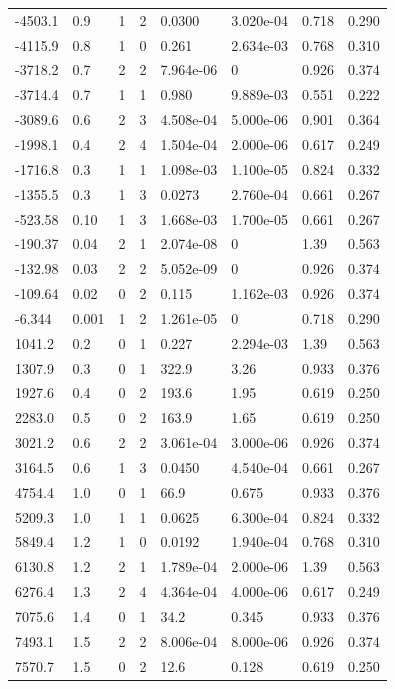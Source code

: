 \documentclass[preview]{standalone}
\begin{document}
{{\begin{tabular}{L{1.2cm}C{1.2cm} C{0.3cm}C{0.5cm} C{1.4cm}C{1.4cm} C{1.4cm}C{1.4cm}}
  -4503.1  &   0.9  & 1     &  2 &  0.0300  & 3.020e-04  & 0.718 &  0.290   \\ 
  -4115.9  &   0.8  & 1     &  0 &  0.261  & 2.634e-03  & 0.768 &  0.310   \\ 
  -3718.2  &   0.7  & 2     &  2 &  7.964e-06  & 0  & 0.926 &  0.374   \\ 
  -3714.4  &   0.7  & 1     &  1 &  0.980  & 9.889e-03  & 0.551 &  0.222   \\ 
  -3089.6  &   0.6  & 2     &  3 &  4.508e-04  & 5.000e-06  & 0.901 &  0.364   \\ 
  -1998.1  &   0.4  & 2     &  4 &  1.504e-04  & 2.000e-06  & 0.617 &  0.249   \\ 
  -1716.8  &   0.3  & 1     &  1 &  1.098e-03  & 1.100e-05  & 0.824 &  0.332   \\ 
  -1355.5  &   0.3  & 1     &  3 &  0.0273  & 2.760e-04  & 0.661 &  0.267   \\ 
  -523.58  &  0.10  & 1     &  3 &  1.668e-03  & 1.700e-05  & 0.661 &  0.267   \\ 
  -190.37  &  0.04  & 2     &  1 &  2.074e-08  & 0  & 1.39 &  0.563   \\ 
  -132.98  &  0.03  & 2     &  2 &  5.052e-09  & 0  & 0.926 &  0.374   \\ 
  -109.64  &  0.02  & 0     &  2 &  0.115  & 1.162e-03  & 0.926 &  0.374   \\ 
  -6.344  &  0.001  & 1     &  2 &  1.261e-05  & 0  & 0.718 &  0.290   \\ 
  1041.2  &   0.2  & 0     &  1 &  0.227  & 2.294e-03  & 1.39 &  0.563   \\ 
  1307.9  &   0.3  & 0     &  1 &  322.9  & 3.26  & 0.933 &  0.376   \\ 
  1927.6  &   0.4  & 0     &  2 &  193.6  & 1.95  & 0.619 &  0.250   \\ 
  2283.0  &   0.5  & 0     &  2 &  163.9  & 1.65  & 0.619 &  0.250   \\ 
  3021.2  &   0.6  & 2     &  2 &  3.061e-04  & 3.000e-06  & 0.926 &  0.374   \\ 
  3164.5  &   0.6  & 1     &  3 &  0.0450  & 4.540e-04  & 0.661 &  0.267   \\ 
  4754.4  &   1.0  & 0     &  1 &  66.9  & 0.675  & 0.933 &  0.376   \\ 
  5209.3  &   1.0  & 1     &  1 &  0.0625  & 6.300e-04  & 0.824 &  0.332   \\ 
  5849.4  &   1.2  & 1     &  0 &  0.0192  & 1.940e-04  & 0.768 &  0.310   \\ 
  6130.8  &   1.2  & 2     &  1 &  1.789e-04  & 2.000e-06  & 1.39 &  0.563   \\ 
  6276.4  &   1.3  & 2     &  4 &  4.364e-04  & 4.000e-06  & 0.617 &  0.249   \\ 
  7075.6  &   1.4  & 0     &  1 &  34.2  & 0.345  & 0.933 &  0.376   \\ 
  7493.1  &   1.5  & 2     &  2 &  8.006e-04  & 8.000e-06  & 0.926 &  0.374   \\ 
  7570.7  &   1.5  & 0     &  2 &  12.6  & 0.128  & 0.619 &  0.250   \\ 
\hline 
\end{tabular} 

}}
\end{document}
